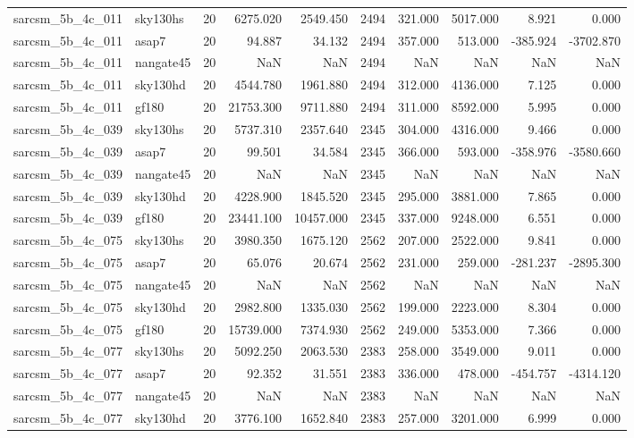 \documentclass{article}
\begin{document}
\begin{longtable}{llrrrrrrrr}
sarcsm\_5b\_4c\_011 & sky130hs & 20 & 6275.020 & 2549.450 & 2494 & 321.000 & 5017.000 & 8.921 & 0.000 \\
sarcsm\_5b\_4c\_011 & asap7 & 20 & 94.887 & 34.132 & 2494 & 357.000 & 513.000 & -385.924 & -3702.870 \\
sarcsm\_5b\_4c\_011 & nangate45 & 20 & NaN & NaN & 2494 & NaN & NaN & NaN & NaN \\
sarcsm\_5b\_4c\_011 & sky130hd & 20 & 4544.780 & 1961.880 & 2494 & 312.000 & 4136.000 & 7.125 & 0.000 \\
sarcsm\_5b\_4c\_011 & gf180 & 20 & 21753.300 & 9711.880 & 2494 & 311.000 & 8592.000 & 5.995 & 0.000 \\
sarcsm\_5b\_4c\_039 & sky130hs & 20 & 5737.310 & 2357.640 & 2345 & 304.000 & 4316.000 & 9.466 & 0.000 \\
sarcsm\_5b\_4c\_039 & asap7 & 20 & 99.501 & 34.584 & 2345 & 366.000 & 593.000 & -358.976 & -3580.660 \\
sarcsm\_5b\_4c\_039 & nangate45 & 20 & NaN & NaN & 2345 & NaN & NaN & NaN & NaN \\
sarcsm\_5b\_4c\_039 & sky130hd & 20 & 4228.900 & 1845.520 & 2345 & 295.000 & 3881.000 & 7.865 & 0.000 \\
sarcsm\_5b\_4c\_039 & gf180 & 20 & 23441.100 & 10457.000 & 2345 & 337.000 & 9248.000 & 6.551 & 0.000 \\
sarcsm\_5b\_4c\_075 & sky130hs & 20 & 3980.350 & 1675.120 & 2562 & 207.000 & 2522.000 & 9.841 & 0.000 \\
sarcsm\_5b\_4c\_075 & asap7 & 20 & 65.076 & 20.674 & 2562 & 231.000 & 259.000 & -281.237 & -2895.300 \\
sarcsm\_5b\_4c\_075 & nangate45 & 20 & NaN & NaN & 2562 & NaN & NaN & NaN & NaN \\
sarcsm\_5b\_4c\_075 & sky130hd & 20 & 2982.800 & 1335.030 & 2562 & 199.000 & 2223.000 & 8.304 & 0.000 \\
sarcsm\_5b\_4c\_075 & gf180 & 20 & 15739.000 & 7374.930 & 2562 & 249.000 & 5353.000 & 7.366 & 0.000 \\
sarcsm\_5b\_4c\_077 & sky130hs & 20 & 5092.250 & 2063.530 & 2383 & 258.000 & 3549.000 & 9.011 & 0.000 \\
sarcsm\_5b\_4c\_077 & asap7 & 20 & 92.352 & 31.551 & 2383 & 336.000 & 478.000 & -454.757 & -4314.120 \\
sarcsm\_5b\_4c\_077 & nangate45 & 20 & NaN & NaN & 2383 & NaN & NaN & NaN & NaN \\
sarcsm\_5b\_4c\_077 & sky130hd & 20 & 3776.100 & 1652.840 & 2383 & 257.000 & 3201.000 & 6.999 & 0.000 \\

\end{longtable}
\end{document}
